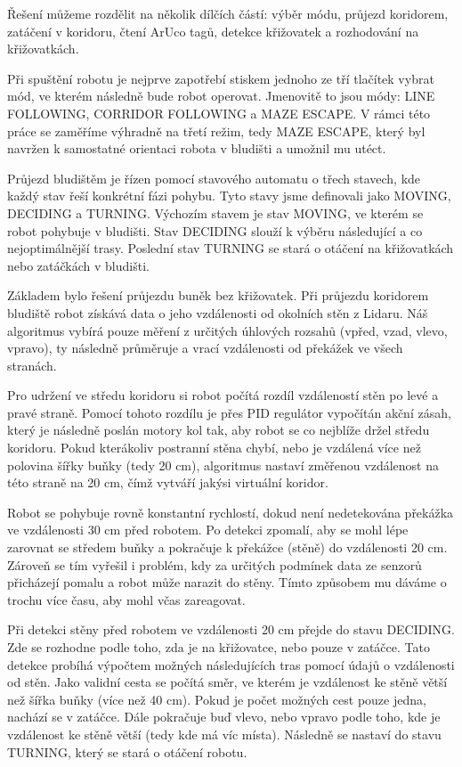 Řešení můžeme rozdělit na několik dílčích částí: výběr módu, průjezd koridorem, zatáčení v koridoru, čtení ArUco tagů, detekce křižovatek a rozhodování na křižovatkách.

Při spuštění robotu je nejprve zapotřebí stiskem jednoho ze tří tlačítek vybrat mód, ve kterém následně bude robot operovat. Jmenovitě to jsou módy: LINE FOLLOWING, CORRIDOR FOLLOWING a MAZE ESCAPE. V rámci této práce se zaměříme výhradně na třetí režim, tedy MAZE ESCAPE, který byl navržen k samostatné orientaci robota v bludišti a umožnil mu utéct.

Průjezd bludištěm je řízen pomocí stavového automatu o třech stavech, kde každý stav řeší konkrétní fázi pohybu. Tyto stavy jsme definovali jako MOVING, DECIDING a TURNING. Výchozím stavem je stav MOVING, ve kterém se robot pohybuje v bludišti. Stav DECIDING slouží k výběru následující a co nejoptimálnější trasy. Poslední stav TURNING se stará o otáčení na křižovatkách nebo zatáčkách v bludišti.

Základem bylo řešení průjezdu buněk bez křižovatek. Při průjezdu koridorem bludiště robot získává data o jeho vzdálenosti od okolních stěn z Lidaru. Náš algoritmus vybírá pouze měření z určitých úhlových rozsahů (vpřed, vzad, vlevo, vpravo), ty následně průměruje a vrací vzdálenosti od překážek ve všech stranách.

Pro udržení ve středu koridoru si robot počítá rozdíl vzdáleností stěn po levé a pravé straně. Pomocí tohoto rozdílu je přes PID regulátor vypočítán akční zásah, který je následně poslán motory kol tak, aby robot se co nejblíže držel středu koridoru. Pokud kterákoliv postranní stěna chybí, nebo je vzdálená více než polovina šířky buňky (tedy 20 cm), algoritmus nastaví změřenou vzdálenost na této straně na 20 cm, čímž vytváří jakýsi virtuální koridor.

Robot se pohybuje rovně konstantní rychlostí, dokud není nedetekována překážka ve vzdálenosti 30 cm před robotem. Po detekci zpomalí, aby se mohl lépe zarovnat se středem buňky a pokračuje k překážce (stěně) do vzdálenosti 20 cm. Zároveň se tím vyřešil i problém, kdy za určitých podmínek data ze senzorů přicházejí pomalu a robot může narazit do stěny. Tímto způsobem mu dáváme o trochu více času, aby mohl včas zareagovat.

Při detekci stěny před robotem ve vzdálenosti 20 cm přejde do stavu DECIDING. Zde se rozhodne podle toho, zda je na křižovatce, nebo pouze v zatáčce. Tato detekce probíhá výpočtem možných následujících tras pomocí údajů o vzdálenosti od stěn. Jako validní cesta se počítá směr, ve kterém je vzdálenost ke stěně větší než šířka buňky (více než 40 cm). Pokud je počet možných cest pouze jedna, nachází se v zatáčce. Dále pokračuje buď vlevo, nebo vpravo podle toho, kde je vzdálenost ke stěně větší (tedy kde má víc místa). Následně se nastaví do stavu TURNING, který se stará o otáčení robotu.

